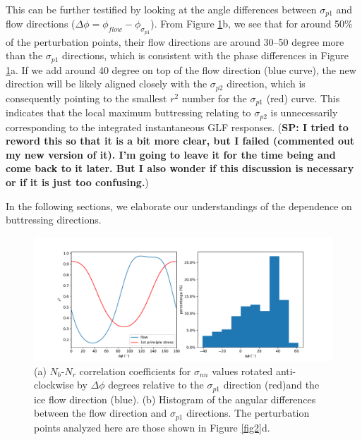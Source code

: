 \documentclass[review,oneside]{igs}
\begin{document}
This can be further testified by looking at the angle differences between $\sigma_{p1}$ and flow directions ($\Delta \phi = \phi_{flow}-\phi_{\sigma_{p1}}$). From Figure \ref{fig3}b, we see that for around 50\% of the perturbation points, their flow directions are around 30--50 degree more than the $\sigma_{p1}$ directions, which is consistent with the phase differences in Figure \ref{fig3}a. If we add around 40 degree on top of the flow direction (blue curve), the new direction will be likely aligned closely with the $\sigma_{p2}$ direction, which is consequently pointing to the smallest $r^2$ number for the $\sigma_{p1}$ (red) curve. This indicates that the local maximum buttressing relating to $\sigma_{p2}$ is unnecessarily corresponding to the integrated instantaneous GLF responses. (\textbf{SP: I tried to reword this so that it is a bit more clear, but I failed (commented out my new version of it). I'm going to leave it for the time being and come back to it later. But I also wonder if this discussion is necessary or if it is just too confusing.})

In the following sections, we elaborate our understandings of the dependence on buttressing directions.

\begin{figure}
\centering
\includegraphics[width=1\linewidth]{figs/fig3.pdf}
    \caption{(a) $N_b$-$N_r$ correlation coefficients for $\sigma_{nn}$ values rotated anti-clockwise by $\Delta\phi$ degrees relative to the $\sigma_{p1}$ direction (red)and the ice flow direction (blue). (b) Histogram of the angular differences between the flow direction and $\sigma_{p1}$ directions. The perturbation points analyzed here are those shown in Figure \ref{fig2}d.}
    \label{fig3}
\end{figure}

\end{document}
